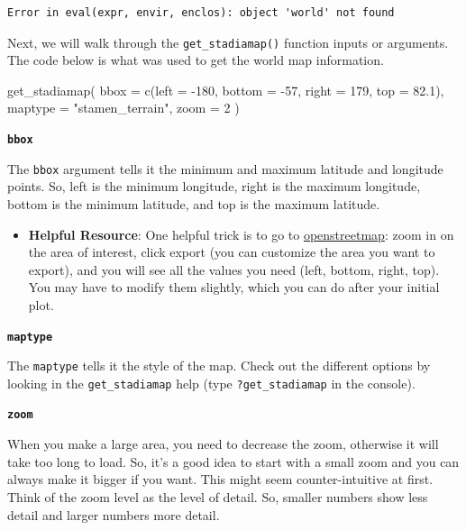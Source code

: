 \documentclass[
  letterpaper,
  DIV=11,
  numbers=noendperiod]{scrreprt}
\newenvironment{Shaded}{\begin{snugshade}}{\end{snugshade}}
\newcommand{\AttributeTok}[1]{\textcolor[rgb]{0.40,0.45,0.13}{#1}}
\newcommand{\DecValTok}[1]{\textcolor[rgb]{0.68,0.00,0.00}{#1}}
\newcommand{\FloatTok}[1]{\textcolor[rgb]{0.68,0.00,0.00}{#1}}
\newcommand{\FunctionTok}[1]{\textcolor[rgb]{0.28,0.35,0.67}{#1}}
\newcommand{\NormalTok}[1]{\textcolor[rgb]{0.00,0.23,0.31}{#1}}
\newcommand{\SpecialCharTok}[1]{\textcolor[rgb]{0.37,0.37,0.37}{#1}}
\newcommand{\StringTok}[1]{\textcolor[rgb]{0.13,0.47,0.30}{#1}}
\providecommand{\tightlist}{%
  \setlength{\itemsep}{0pt}\setlength{\parskip}{0pt}}\usepackage{longtable,booktabs,array}
\begin{document}
\begin{verbatim}
Error in eval(expr, envir, enclos): object 'world' not found
\end{verbatim}

Next, we will walk through the \texttt{get\_stadiamap()} function inputs
or arguments. The code below is what was used to get the world map
information.

\begin{Shaded}
\begin{Highlighting}[]
\FunctionTok{get\_stadiamap}\NormalTok{(}
  \AttributeTok{bbox =} \FunctionTok{c}\NormalTok{(}\AttributeTok{left =} \SpecialCharTok{{-}}\DecValTok{180}\NormalTok{, }\AttributeTok{bottom =} \SpecialCharTok{{-}}\DecValTok{57}\NormalTok{, }\AttributeTok{right =} \DecValTok{179}\NormalTok{, }\AttributeTok{top =} \FloatTok{82.1}\NormalTok{),}
  \AttributeTok{maptype =} \StringTok{"stamen\_terrain"}\NormalTok{,}
  \AttributeTok{zoom =} \DecValTok{2}
\NormalTok{)}
\end{Highlighting}
\end{Shaded}

\textbf{\texttt{bbox}}

The \texttt{bbox} argument tells it the minimum and maximum latitude and
longitude points. So, left is the minimum longitude, right is the
maximum longitude, bottom is the minimum latitude, and top is the
maximum latitude.

\begin{itemize}
\tightlist
\item
  \textbf{Helpful Resource}: One helpful trick is to go to
  \href{https://www.openstreetmap.org}{openstreetmap}: zoom in on the
  area of interest, click export (you can customize the area you want to
  export), and you will see all the values you need (left, bottom,
  right, top). You may have to modify them slightly, which you can do
  after your initial plot.
\end{itemize}

\textbf{\texttt{maptype}}

The \texttt{maptype} tells it the style of the map. Check out the
different options by looking in the \texttt{get\_stadiamap} help (type
\texttt{?get\_stadiamap} in the console).

\textbf{\texttt{zoom}}

When you make a large area, you need to decrease the zoom, otherwise it
will take too long to load. So, it's a good idea to start with a small
zoom and you can always make it bigger if you want. This might seem
counter-intuitive at first. Think of the zoom level as the level of
detail. So, smaller numbers show less detail and larger numbers more
detail.
\end{document}
